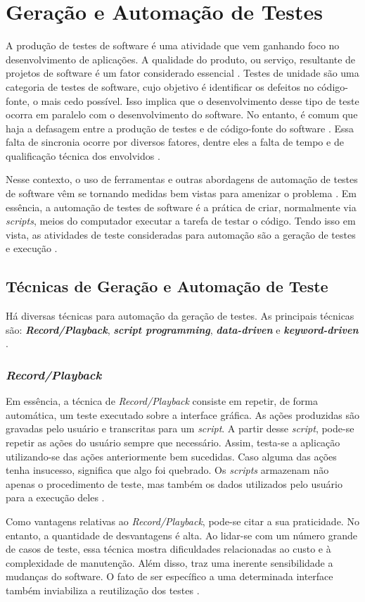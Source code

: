 \section{Geração e Automação de Testes}
A produção de testes de software é uma atividade que vem ganhando foco no
desenvolvimento de aplicações. A qualidade do produto, ou serviço, resultante
de projetos de software é um fator considerado essencial \cite{barbosaEtAl2009}.
Testes de unidade são uma categoria de testes de software, cujo objetivo é
identificar os defeitos no código-fonte, o mais cedo possível. Isso implica que
o desenvolvimento desse tipo de teste ocorra em paralelo com o desenvolvimento
do software. No entanto, é comum que haja a defasagem entre a produção de testes
e de código-fonte do software \cite{fantinatoEtAl2004}. Essa falta de sincronia
ocorre por diversos fatores, dentre eles a falta de tempo e de qualificação
técnica dos envolvidos \cite{fantinatoEtAl2004}.
\par
\indent Nesse contexto, o uso de ferramentas e outras abordagens de automação
de testes de software vêm se tornando medidas bem vistas para amenizar o problema
\cite{fantinatoEtAl2004}. Em essência, a automação de testes de software é a prática
de criar, normalmente via \textit{scripts}, meios do computador executar a tarefa
de testar o código. Tendo isso em vista, as atividades de teste consideradas para
automação são a geração de testes e execução \cite{fantinatoEtAl2004}.

\subsection{Técnicas de Geração e Automação de Teste}
Há diversas técnicas para automação da geração de testes. As principais técnicas
são: \textbf{\textit{Record/Playback}}, \textbf{\textit{script programming}},
\textbf{\textit{data-driven}} e \textbf{\textit{keyword-driven}}
\cite{fantinatoEtAl2004}.
\subsubsection{\textit{Record/Playback}}
Em essência, a técnica de \textit{Record/Playback} consiste em repetir, de forma
automática, um teste executado sobre a interface gráfica. As ações produzidas
são gravadas pelo usuário e transcritas para um \textit{script}. A partir desse
\textit{script}, pode-se repetir as ações do usuário sempre que necessário. Assim,
testa-se a aplicação utilizando-se das ações anteriormente bem sucedidas. Caso
alguma das ações tenha insucesso, significa que algo foi quebrado. Os \textit{scripts}
armazenam não apenas o procedimento de teste, mas também os dados utilizados pelo
usuário para a execução deles \cite{kent2007}.
\par
\indent Como vantagens relativas ao \textit{Record/Playback}, pode-se citar a
sua praticidade. No entanto, a quantidade de desvantagens é alta. Ao lidar-se
com um número grande de casos de teste, essa técnica mostra dificuldades
relacionadas ao custo e à complexidade de manutenção. Além disso, traz uma
inerente sensibilidade a mudanças do software. O fato de ser específico a uma
determinada interface também inviabiliza a reutilização dos testes \cite{fantinatoEtAl2004}.
